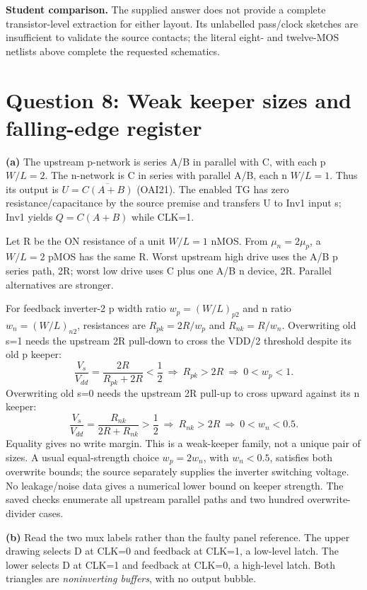 \documentclass[10pt]{article}
\begin{document}
\textbf{Student comparison.} The supplied answer does not provide a complete transistor-level extraction for either layout. Its unlabelled pass/clock sketches are insufficient to validate the source contacts; the literal eight- and twelve-MOS netlists above complete the requested schematics.

\newpage\section*{Question 8: Weak keeper sizes and falling-edge register}
\textbf{(a)} The upstream p-network is series A/B in parallel with C, with each p $W/L=2$. The n-network is C in series with parallel A/B, each n $W/L=1$. Thus its output is $U=\overline{C(A+B)}$ (OAI21). The enabled TG has zero resistance/capacitance by the source premise and transfers U to Inv1 input s; Inv1 yields $Q=C(A+B)$ while CLK=1.

Let R be the ON resistance of a unit $W/L=1$ nMOS. From $\mu_n=2\mu_p$, a $W/L=2$ pMOS has the same R. Worst upstream high drive uses the A/B p series path, 2R; worst low drive uses C plus one A/B n device, 2R. Parallel alternatives are stronger.

For feedback inverter-2 p width ratio $w_p=(W/L)_{p2}$ and n ratio $w_n=(W/L)_{n2}$, resistances are $R_{pk}=2R/w_p$ and $R_{nk}=R/w_n$. Overwriting old s=1 needs the upstream 2R pull-down to cross the VDD/2 threshold despite its old p keeper:
\[\frac{V_s}{V_{dd}}=\frac{2R}{R_{pk}+2R}<\frac12\ \Longrightarrow\ R_{pk}>2R\ \Longrightarrow\ \boxed{0<w_p<1.}\]
Overwriting old s=0 needs the upstream 2R pull-up to cross upward against its n keeper:
\[\frac{V_s}{V_{dd}}=\frac{R_{nk}}{2R+R_{nk}}>\frac12\ \Longrightarrow\ R_{nk}>2R\ \Longrightarrow\ \boxed{0<w_n<0.5.}\]
Equality gives no write margin. This is a weak-keeper family, not a unique pair of sizes. A usual equal-strength choice $w_p=2w_n$, with $w_n<0.5$, satisfies both overwrite bounds; the source separately supplies the inverter switching voltage. No leakage/noise data gives a numerical lower bound on keeper strength. The saved checks enumerate all upstream parallel paths and two hundred overwrite-divider cases.

\textbf{(b)} Read the two mux labels rather than the faulty panel reference. The upper drawing selects D at CLK=0 and feedback at CLK=1, a low-level latch. The lower selects D at CLK=1 and feedback at CLK=0, a high-level latch. Both triangles are \emph{noninverting buffers}, with no output bubble.
\end{document}
